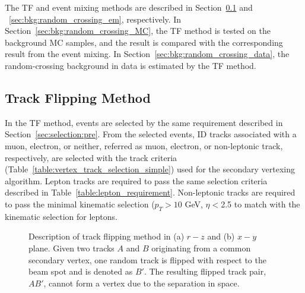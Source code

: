 The TF and event mixing methods are described in Section~\ref{sec:bkg:random_crossing_tf} and ~\ref{sec:bkg:random_crossing_em}, respectively. In Section~\ref{sec:bkg:random_crossing_MC}, the TF method is tested on the background MC samples, and the result is compared with the corresponding result from the event mixing. In Section~\ref{sec:bkg:random_crossing_data}, the random-crossing background in data is estimated by the TF method.%

\subsection{Track Flipping Method}
\label{sec:bkg:random_crossing_tf}

In the TF method, events are selected by the same requirement described in Section~\ref{sec:selection:pre}. From the selected events, ID tracks associated with a muon, electron, or neither, referred as muon, electron, or non-leptonic track, respectively, are selected with the track criteria (Table~\ref{table:vertex_track_selection_simple}) used for the secondary vertexing algorithm. Lepton tracks are required to pass the same selection criteria described in Table~\ref{table:lepton_requirement}. Non-leptonic tracks are required to pass the minimal kinematic selection ($p_{T} > 10$ GeV, $\eta < $2.5 to match with the kinematic selection for leptons.

\begin{figure}[!htb]
	\centering
	\caption{Description of track flipping method in (a) $r-z$ and (b) $x-y$ plane. Given two tracks $A$ and $B$ originating from a common secondary vertex, one random track is flipped with respect to the beam spot and is denoted as $B'$. The resulting flipped track pair, $AB'$, cannot form a vertex due to the separation in space.}
	\label{fig:TF_diagram}
\end{figure}

